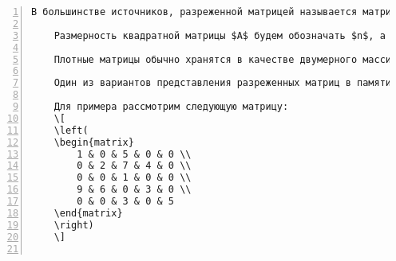 \documentclass[bachelor, och, pract]{SCWorks}
\begin{document}
\begin{Verbatim}[fontsize=\small, numbers=left]
	В большинстве источников, разреженной матрицей называется матрица, в которой мало ненулевых элементов. Это нельзя назвать определением из-за слова <<мало>>. В понятие разреженной матрицы определяется так: <<Мы можем называть матрицу разреженной, если применение к ней методов, описываемых в книге, экономит память и/или время>>. Таким образом, следует дать определение алгоритму для разреженных матриц. Алгоритмом для разреженных матриц будем называть алгоритм, у которого время работы и необходимый объем памяти зависят от количества ненулевых элементов в матрице.
	
	Размерность квадратной матрицы $A$ будем обозначать $n$, а количество ненулевых элементов в ней $|A|$.
	
	Плотные матрицы обычно хранятся в качестве двумерного массива $n\times n$. Будем обозначать такой массив a. Разреженные матрицы не стоит хранить таким способом из-за слишком большого потребления памяти, которая будет занята в основном нулевыми элементами.
	
	Один из вариантов представления разреженных матриц в памяти компьютера "--- в виде трех массивов: \verb"column", \verb"value" и \verb"rowIndex". Размеры массивов \verb"column" и \verb"value" равны $|A|$. Размер \verb"rowIndex" равен $n+1$. Ненулевые элементы матрицы $A$ хранятся последовательно по строкам в этих массивах. Элемент \verb"column[i]" содержит номер столбца, в котором содержится \verb"i"-й ненулевой элемент, а \verb"value[i]" "--- его величину. Массив \verb"rowIndex[i]" содержит в себе индекс первого ненулевого элемента \verb"i"-й строки. Все ненулевые элементы \verb"i"-й строки содержатся в массивах \verb"column" и \verb"value" в элементах с индексами от \verb"rowIndex[i]" по \verb"rowIndex[i + 1]-1". Для удобства полагают \verb"rowIndex["$n$\verb"]"$=|A|$.
	
	Для примера рассмотрим следующую матрицу:
	\[
	\left(
	\begin{matrix}
		1 & 0 & 5 & 0 & 0 \\
		0 & 2 & 7 & 4 & 0 \\
		0 & 0 & 1 & 0 & 0 \\
		9 & 6 & 0 & 3 & 0 \\
		0 & 0 & 3 & 0 & 5
	\end{matrix}
	\right)
	\]
	

\end{Verbatim}
\end{document}
